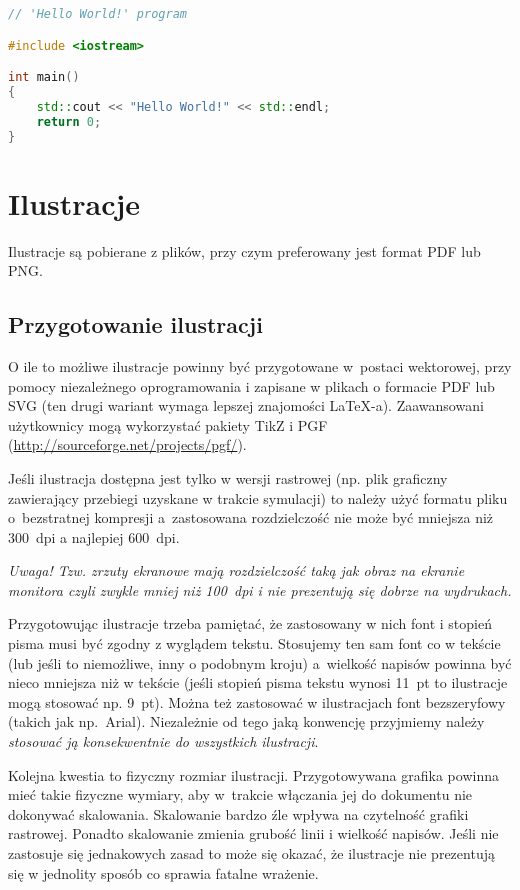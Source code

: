 \begin{lstlisting}[language=c++, caption={Przykładowy program C++}, label={lst:hello}]
// 'Hello World!' program 

#include <iostream>

int main()
{
	std::cout << "Hello World!" << std::endl;
	return 0;
}
\end{lstlisting}



\section{Ilustracje}
\label{sec:ilustracje}
Ilustracje są pobierane z plików, przy  czym preferowany jest format PDF lub PNG.
\subsection{Przygotowanie ilustracji}
O ile to możliwe ilustracje powinny być przygotowane w~postaci wektorowej, przy pomocy niezależnego oprogramowania i zapisane w plikach o formacie PDF lub SVG (ten drugi wariant wymaga lepszej znajomości {\LaTeX}-a). Zaawansowani użytkownicy mogą wykorzystać pakiety TikZ i PGF (\url{http://sourceforge.net/projects/pgf/}). 

Jeśli ilustracja dostępna jest tylko w wersji rastrowej (np. plik graficzny zawierający przebiegi uzyskane w trakcie  symulacji) to należy użyć formatu pliku o~bezstratnej kompresji a~zastosowana rozdzielczość  nie może być mniejsza niż 300~dpi a najlepiej 600~dpi. 

\textit{Uwaga! Tzw. zrzuty ekranowe mają rozdzielczość taką jak obraz na ekranie monitora czyli zwykle mniej niż 100~dpi i nie prezentują się dobrze na wydrukach.}   

Przygotowując ilustracje trzeba pamiętać, że zastosowany w nich font i stopień pisma musi być zgodny z wyglądem tekstu. Stosujemy ten sam font co w tekście (lub jeśli to niemożliwe, inny o podobnym kroju) a~wielkość napisów powinna być nieco mniejsza niż w tekście (jeśli stopień pisma tekstu wynosi 11~pt to ilustracje mogą stosować np. 9~pt). Można też zastosować w ilustracjach  font  bezszeryfowy (takich jak np.~Arial). Niezależnie od tego jaką konwencję przyjmiemy należy \textit{stosować ją konsekwentnie do wszystkich ilustracji}.

Kolejna kwestia to fizyczny rozmiar ilustracji. Przygotowywana grafika powinna mieć takie fizyczne wymiary, aby w~trakcie włączania jej do dokumentu nie dokonywać skalowania. Skalowanie bardzo źle wpływa na czytelność grafiki rastrowej. Ponadto skalowanie zmienia grubość linii i wielkość napisów. Jeśli nie zastosuje się jednakowych zasad to może się okazać, że ilustracje nie prezentują się w jednolity sposób co sprawia fatalne wrażenie.


